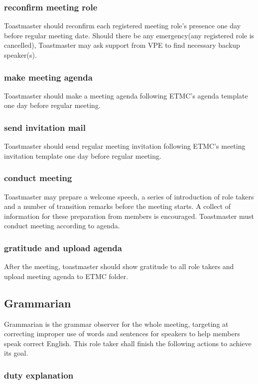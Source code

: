\subsubsection{reconfirm meeting role}
Toastmaster should reconfirm each registered meeting role's presence one day before 
regular meeting date. Should there be any emergency(any registered role is cancelled),
Toastmaster may ask support from VPE to find necessary backup speaker(s).

\subsubsection{make meeting agenda}
Toastmaster should make a meeting agenda following ETMC's agenda template one day before 
regular meeting.

\subsubsection{send invitation mail}
Toastmaster should send regular meeting invitation following ETMC's meeting invitation 
template one day before regular meeting.

\subsubsection{conduct meeting}
Toastmaster may prepare a welcome speech, a series of introduction of role takers and 
a number of transition remarks before the meeting starts. A collect of information for
these preparation from members is encouraged. Toastmaster must conduct meeting according
to agenda.

\subsubsection{gratitude and upload agenda}
After the meeting, toastmaster should show gratitude to all role takers and upload 
meeting agenda to ETMC folder. 

\subsection{Grammarian}

Grammarian is the grammar observer for the whole meeting, targeting at correcting improper 
use of words and sentences for speakers to help members speak correct English. This role 
taker shall finish the following actions to achieve its goal.

\subsubsection{duty explanation}

